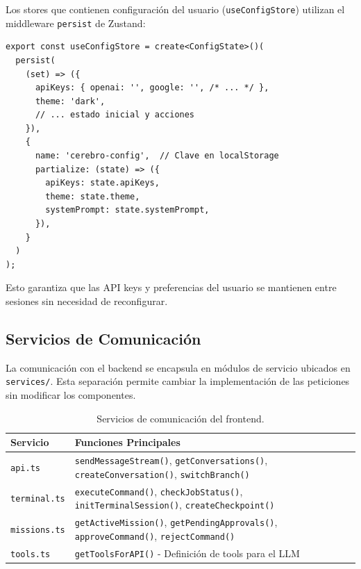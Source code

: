 Los stores que contienen configuración del usuario (\texttt{useConfigStore}) utilizan el middleware \texttt{persist} de Zustand:

\begin{verbatim}
export const useConfigStore = create<ConfigState>()(
  persist(
    (set) => ({
      apiKeys: { openai: '', google: '', /* ... */ },
      theme: 'dark',
      // ... estado inicial y acciones
    }),
    {
      name: 'cerebro-config',  // Clave en localStorage
      partialize: (state) => ({
        apiKeys: state.apiKeys,
        theme: state.theme,
        systemPrompt: state.systemPrompt,
      }),
    }
  )
);
\end{verbatim}

Esto garantiza que las API keys y preferencias del usuario se mantienen entre sesiones sin necesidad de reconfigurar.

\subsection{Servicios de Comunicación}

La comunicación con el backend se encapsula en módulos de servicio ubicados en \texttt{services/}. Esta separación permite cambiar la implementación de las peticiones sin modificar los componentes.

\begin{table}[H]
\centering
\renewcommand{\arraystretch}{1.2}
\begin{tabular}{|l|p{7.5cm}|}
\hline
\rowcolor[gray]{0.85}
\textbf{Servicio} & \textbf{Funciones Principales} \\
\hline
\texttt{api.ts} & \texttt{sendMessageStream()}, \texttt{getConversations()}, \texttt{createConversation()}, \texttt{switchBranch()} \\
\hline
\texttt{terminal.ts} & \texttt{executeCommand()}, \texttt{checkJobStatus()}, \texttt{initTerminalSession()}, \texttt{createCheckpoint()} \\
\hline
\texttt{missions.ts} & \texttt{getActiveMission()}, \texttt{getPendingApprovals()}, \texttt{approveCommand()}, \texttt{rejectCommand()} \\
\hline
\texttt{tools.ts} & \texttt{getToolsForAPI()} - Definición de tools para el LLM \\
\hline
\end{tabular}
\caption{Servicios de comunicación del frontend.}
\label{tab:servicios_frontend}
\end{table}

